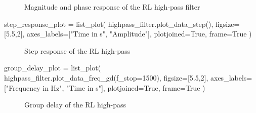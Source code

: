 \begin{figure}[H]
    \centering
    \begin{subfigure}{\textwidth}
        \centering
    \end{subfigure}
    \quad
    \begin{subfigure}{\textwidth}
        \centering
    \end{subfigure}
    \caption{Magnitude and phase response of the RL high-pass filter}
\end{figure}

\begin{sagesilent}
    step_response_plot = list_plot(
        highpass_filter.plot_data_step(),
        figsize=[5.5,2],
        axes_labels=["Time in s", "Amplitude"],
        plotjoined=True,
        frame=True
    )
\end{sagesilent}

\begin{figure}[H]
    \centering
    \caption{Step response of the RL high-pass}
\end{figure}

\begin{sagesilent}
    group_delay_plot = list_plot(
        highpass_filter.plot_data_freq_gd(f_stop=1500),
        figsize=[5.5,2],
        axes_labels=["Frequency in Hz", "Time in s"],
        plotjoined=True,
        frame=True
    )
\end{sagesilent}

\begin{figure}[H]
    \centering
    \caption{Group delay of the RL high-pass}
\end{figure}